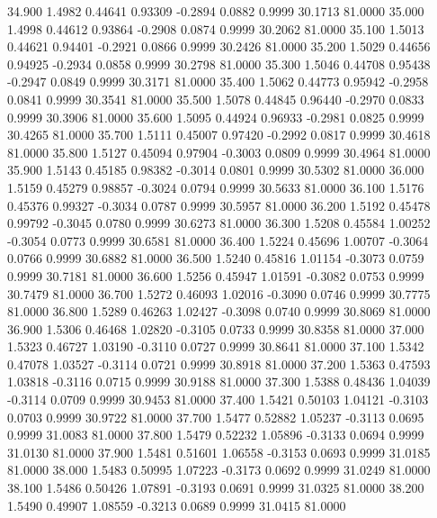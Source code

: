   34.900   1.4982   0.44641   0.93309  -0.2894   0.0882   0.9999  30.1713  81.0000
  35.000   1.4998   0.44612   0.93864  -0.2908   0.0874   0.9999  30.2062  81.0000
  35.100   1.5013   0.44621   0.94401  -0.2921   0.0866   0.9999  30.2426  81.0000
  35.200   1.5029   0.44656   0.94925  -0.2934   0.0858   0.9999  30.2798  81.0000
  35.300   1.5046   0.44708   0.95438  -0.2947   0.0849   0.9999  30.3171  81.0000
  35.400   1.5062   0.44773   0.95942  -0.2958   0.0841   0.9999  30.3541  81.0000
  35.500   1.5078   0.44845   0.96440  -0.2970   0.0833   0.9999  30.3906  81.0000
  35.600   1.5095   0.44924   0.96933  -0.2981   0.0825   0.9999  30.4265  81.0000
  35.700   1.5111   0.45007   0.97420  -0.2992   0.0817   0.9999  30.4618  81.0000
  35.800   1.5127   0.45094   0.97904  -0.3003   0.0809   0.9999  30.4964  81.0000
  35.900   1.5143   0.45185   0.98382  -0.3014   0.0801   0.9999  30.5302  81.0000
  36.000   1.5159   0.45279   0.98857  -0.3024   0.0794   0.9999  30.5633  81.0000
  36.100   1.5176   0.45376   0.99327  -0.3034   0.0787   0.9999  30.5957  81.0000
  36.200   1.5192   0.45478   0.99792  -0.3045   0.0780   0.9999  30.6273  81.0000
  36.300   1.5208   0.45584   1.00252  -0.3054   0.0773   0.9999  30.6581  81.0000
  36.400   1.5224   0.45696   1.00707  -0.3064   0.0766   0.9999  30.6882  81.0000
  36.500   1.5240   0.45816   1.01154  -0.3073   0.0759   0.9999  30.7181  81.0000
  36.600   1.5256   0.45947   1.01591  -0.3082   0.0753   0.9999  30.7479  81.0000
  36.700   1.5272   0.46093   1.02016  -0.3090   0.0746   0.9999  30.7775  81.0000
  36.800   1.5289   0.46263   1.02427  -0.3098   0.0740   0.9999  30.8069  81.0000
  36.900   1.5306   0.46468   1.02820  -0.3105   0.0733   0.9999  30.8358  81.0000
  37.000   1.5323   0.46727   1.03190  -0.3110   0.0727   0.9999  30.8641  81.0000
  37.100   1.5342   0.47078   1.03527  -0.3114   0.0721   0.9999  30.8918  81.0000
  37.200   1.5363   0.47593   1.03818  -0.3116   0.0715   0.9999  30.9188  81.0000
  37.300   1.5388   0.48436   1.04039  -0.3114   0.0709   0.9999  30.9453  81.0000
  37.400   1.5421   0.50103   1.04121  -0.3103   0.0703   0.9999  30.9722  81.0000
  37.700   1.5477   0.52882   1.05237  -0.3113   0.0695   0.9999  31.0083  81.0000
  37.800   1.5479   0.52232   1.05896  -0.3133   0.0694   0.9999  31.0130  81.0000
  37.900   1.5481   0.51601   1.06558  -0.3153   0.0693   0.9999  31.0185  81.0000
  38.000   1.5483   0.50995   1.07223  -0.3173   0.0692   0.9999  31.0249  81.0000
  38.100   1.5486   0.50426   1.07891  -0.3193   0.0691   0.9999  31.0325  81.0000
  38.200   1.5490   0.49907   1.08559  -0.3213   0.0689   0.9999  31.0415  81.0000
